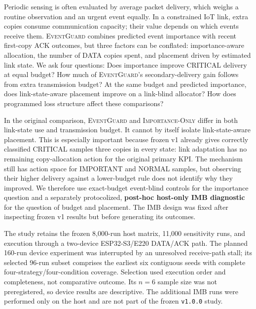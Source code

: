 \documentclass[11pt]{article}
\newcommand{\EG}{\textsc{EventGuard}}
\newcommand{\IO}{\textsc{Importance-Only}}
\begin{document}
Periodic sensing is often evaluated by average packet delivery, which weighs a routine observation and an urgent event equally. In a constrained IoT link, extra copies consume communication capacity; their value depends on which events receive them. \EG{} combines predicted event importance with recent first-copy ACK outcomes, but three factors can be conflated: importance-aware allocation, the number of DATA copies spent, and placement driven by estimated link state. We ask four questions: Does importance improve CRITICAL delivery at equal budget? How much of \EG{}'s secondary-delivery gain follows from extra transmission budget? At the same budget and predicted importance, does link-state-aware placement improve on a link-blind allocator? How does programmed loss structure affect these comparisons?

In the original comparison, \EG{} and \IO{} differ in both link-state use and transmission budget. It cannot by itself isolate link-state-aware placement. This is especially important because frozen v1 already gives correctly classified CRITICAL samples three copies in every state: link adaptation has no remaining copy-allocation action for the original primary KPI. The mechanism still has action space for IMPORTANT and NORMAL samples, but observing their higher delivery against a lower-budget rule does not identify why they improved. We therefore use exact-budget event-blind controls for the importance question and a separately protocolized, \textbf{post-hoc host-only IMB diagnostic} for the question of budget and placement. The IMB design was fixed after inspecting frozen v1 results but before generating its outcomes.

The study retains the frozen 8,000-run host matrix, 11,000 sensitivity runs, and execution through a two-device ESP32-S3/E220 DATA/ACK path. The planned 160-run device experiment was interrupted by an unresolved receive-path stall; its selected 96-run subset comprises the earliest six contiguous seeds with complete four-strategy/four-condition coverage. Selection used execution order and completeness, not comparative outcome. Its \(n=6\) sample size was not preregistered, so device results are descriptive. The additional IMB runs were performed only on the host and are not part of the frozen \texttt{v1.0.0} study.
\end{document}
